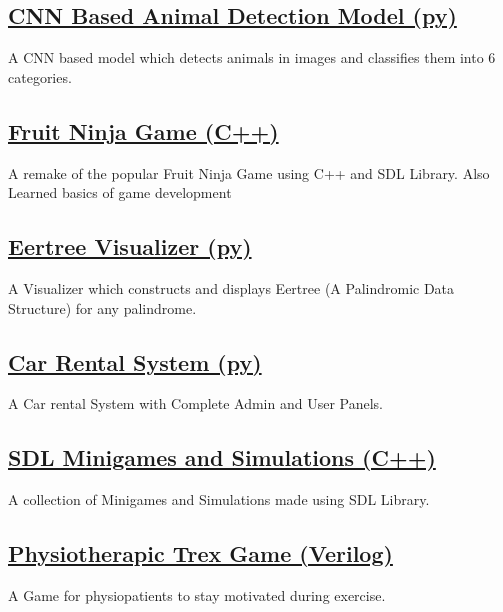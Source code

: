 \documentclass[]{m abbas resume' 2022}
\begin{document}
\begin{minipage}[t]{0.50\textwidth}
	\subsection{\href{https://github.com/smabbasht/CNN-Based-Animal-Detector}{\textbf{CNN Based Animal Detection Model (py)}}}%
	A CNN based model which detects animals in images and classifies them into 6 categories.

	\subsection{\href{https://github.com/smabbasht/Fruit-Ninja-Desktop-Game}{\textbf{Fruit Ninja Game (C++)}}}%
	A remake of the popular Fruit Ninja Game using C++ and SDL Library. Also Learned basics of game development

	\subsection{\href{https://github.com/smabbasht/Eertree-Visualizer}{\textbf{Eertree Visualizer (py)}}}%
	A Visualizer which constructs and displays Eertree (A Palindromic Data Structure) for any palindrome.

	\subsection{\href{https://github.com/smabbasht/Car-Rental-System}{\textbf{Car Rental System (py)}}}%
	A Car rental System with Complete Admin and User Panels.

	\subsection{\href{https://github.com/smabbasht/SDL-Minigames-and-Simulations}{\textbf{SDL Minigames and Simulations (C++)}}}%
	A collection of Minigames and Simulations made using SDL Library.

	\subsection{\href{https://github.com/smabbasht/Physiotherapic-Trex-Game}{\textbf{Physiotherapic Trex Game (Verilog)}}}%
	A Game for physiopatients to stay motivated during exercise.



\end{minipage}
\end{document}
